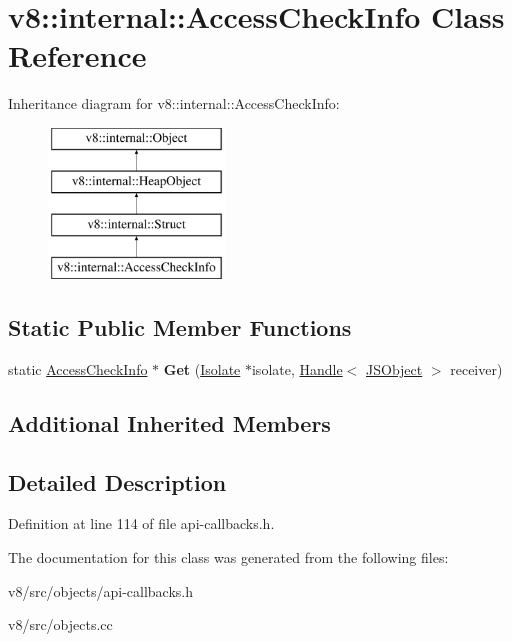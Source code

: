 \hypertarget{classv8_1_1internal_1_1AccessCheckInfo}{}\section{v8\+:\+:internal\+:\+:Access\+Check\+Info Class Reference}
\label{classv8_1_1internal_1_1AccessCheckInfo}
Inheritance diagram for v8\+:\+:internal\+:\+:Access\+Check\+Info\+:\begin{figure}[H]
\begin{center}
\leavevmode
\includegraphics[height=4.000000cm]{classv8_1_1internal_1_1AccessCheckInfo}
\end{center}
\end{figure}
\subsection*{Static Public Member Functions}
\begin{DoxyCompactItemize}
\item 
\mbox{\label{classv8_1_1internal_1_1AccessCheckInfo_a0c2e662ae5e5f08906700a929627baf2}} 
static \mbox{\hyperlink{classv8_1_1internal_1_1AccessCheckInfo}{Access\+Check\+Info}} $\ast$ {\bfseries Get} (\mbox{\hyperlink{classv8_1_1internal_1_1Isolate}{Isolate}} $\ast$isolate, \mbox{\hyperlink{classv8_1_1internal_1_1Handle}{Handle}}$<$ \mbox{\hyperlink{classv8_1_1internal_1_1JSObject}{J\+S\+Object}} $>$ receiver)
\end{DoxyCompactItemize}
\subsection*{Additional Inherited Members}


\subsection{Detailed Description}


Definition at line 114 of file api-\/callbacks.\+h.



The documentation for this class was generated from the following files\+:\begin{DoxyCompactItemize}
\item 
v8/src/objects/api-\/callbacks.\+h\item 
v8/src/objects.\+cc\end{DoxyCompactItemize}
